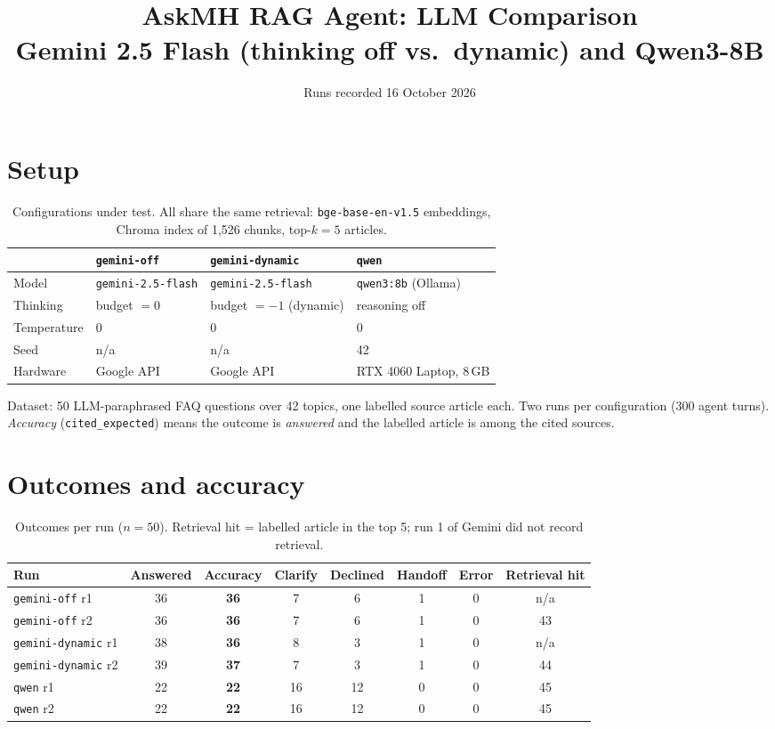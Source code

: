 \documentclass[11pt]{article}
\title{AskMH RAG Agent: LLM Comparison\\\large Gemini 2.5 Flash (thinking off vs.\ dynamic) and Qwen3-8B}
\date{Runs recorded 16 October 2026}
\author{}
\newcommand{\cfg}[1]{\texttt{#1}}
\begin{document}
\maketitle

\section{Setup}

\begin{table}[h]
\centering
\caption{Configurations under test. All share the same retrieval: \cfg{bge-base-en-v1.5} embeddings, Chroma index of 1{,}526 chunks, top-$k=5$ articles.}
\begin{tabular}{@{}llll@{}}
\toprule
 & \cfg{gemini-off} & \cfg{gemini-dynamic} & \cfg{qwen} \\
\midrule
Model       & \cfg{gemini-2.5-flash} & \cfg{gemini-2.5-flash} & \cfg{qwen3:8b} (Ollama) \\
Thinking    & budget $=0$            & budget $=-1$ (dynamic) & reasoning off \\
Temperature & 0                      & 0                      & 0 \\
Seed        & n/a                    & n/a                    & 42 \\
Hardware    & Google API             & Google API             & RTX 4060 Laptop, 8\,GB \\
\bottomrule
\end{tabular}
\end{table}

Dataset: 50 LLM-paraphrased FAQ questions over 42 topics, one labelled source article each.
Two runs per configuration (300 agent turns). \emph{Accuracy} (\cfg{cited\_expected}) means the
outcome is \emph{answered} and the labelled article is among the cited sources.

\section{Outcomes and accuracy}

\begin{table}[h]
\centering
\caption{Outcomes per run ($n=50$). Retrieval hit = labelled article in the top 5; run 1 of Gemini did not record retrieval.}
\label{tab:outcomes}
\begin{tabular}{@{}lccccccc@{}}
\toprule
Run & Answered & \textbf{Accuracy} & Clarify & Declined & Handoff & Error & Retrieval hit \\
\midrule
\cfg{gemini-off} r1     & 36 & \textbf{36} & 7  & 6  & 1 & 0 & n/a \\
\cfg{gemini-off} r2     & 36 & \textbf{36} & 7  & 6  & 1 & 0 & 43 \\
\cfg{gemini-dynamic} r1 & 38 & \textbf{36} & 8  & 3  & 1 & 0 & n/a \\
\cfg{gemini-dynamic} r2 & 39 & \textbf{37} & 7  & 3  & 1 & 0 & 44 \\
\cfg{qwen} r1           & 22 & \textbf{22} & 16 & 12 & 0 & 0 & 45 \\
\cfg{qwen} r2           & 22 & \textbf{22} & 16 & 12 & 0 & 0 & 45 \\
\bottomrule
\end{tabular}
\end{table}
\end{document}
